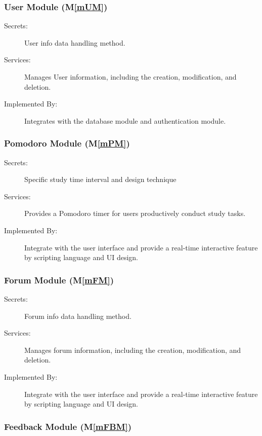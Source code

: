\documentclass[12pt, titlepage]{article}
\newcommand{\mref}[1]{M\ref{#1}}
\begin{document}
\subsubsection{User Module (\mref{mUM})}

\begin{description}
\item[Secrets:] User info data handling method.
\item[Services:] Manages User information, including the creation, modification, and deletion.
\item[Implemented By:] Integrates with the database module and authentication module. 
\end{description}


\subsubsection{Pomodoro Module (\mref{mPM})}

\begin{description}
\item[Secrets:] Specific study time interval and design technique
\item[Services:] Provides a Pomodoro timer for users productively conduct study tasks. 
\item[Implemented By:] Integrate with the user interface and provide a real-time interactive feature by scripting language and UI design.
\end{description}

\subsubsection{Forum Module (\mref{mFM})}

\begin{description}
\item[Secrets:] Forum info data handling method.
\item[Services:] Manages forum information, including the creation, modification, and deletion.
\item[Implemented By:] Integrate with the user interface and provide a real-time interactive feature by scripting language and UI design.
\end{description}

\subsubsection{Feedback Module (\mref{mFBM})}
\end{document}
